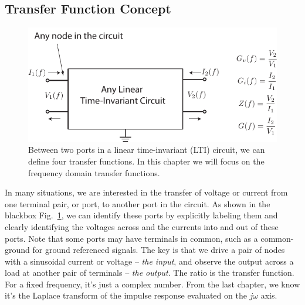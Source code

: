 \subsection{Transfer Function Concept}
\begin{figure}[tb]
\begin{center}
\includegraphics[scale=1]{transfer_func}
\end{center}
\caption{Between two ports in a linear time-invariant (LTI) circuit, we can define four transfer functions.  In this chapter we will focus on the frequency domain transfer functions.} \label{fig:blackboxltiports}
\end{figure}
In many situations, we are interested in the transfer of voltage or current from one terminal pair, or port, to another port in the circuit.  As shown in the blackbox Fig.~\ref{fig:blackboxltiports}, we can identify these ports by explicitly labeling them and clearly identifying the voltages across and the currents into and out of these ports.  Note that some ports may have terminals in common, such as a common-ground for ground referenced signals.  
The key is that we drive a pair of nodes with a sinusoidal current or voltage -- \textit{the input}, and observe the output across a load at another pair of terminals -- \textit{the output}.  The ratio is the transfer function.  For a fixed frequency, it’s just a complex number.  From the last chapter, we know it's the  Laplace transform of the impulse response evaluated on the $j\omega$ axis.
